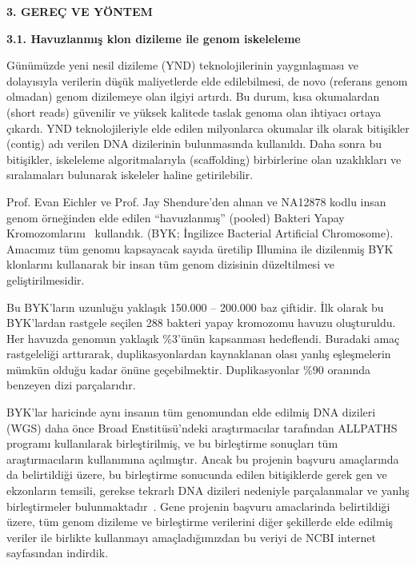 \documentclass[11pt]{article}
\begin{document}
\clearpage


\begin{center}
{\bf \Large 3. GEREÇ VE YÖNTEM} 
\end{center}
\noindent

{\bf \large 3.1. Havuzlanmış klon dizileme ile genom iskeleleme}


Günümüzde yeni nesil dizileme (YND) teknolojilerinin yaygınlaşması ve dolayısıyla verilerin düşük maliyetlerde elde edilebilmesi, de novo (referans genom olmadan) 
genom dizilemeye olan ilgiyi artırdı.
Bu durum, kısa okumalardan (short reads) güvenilir ve yüksek kalitede taslak genoma olan ihtiyacı ortaya çıkardı. YND teknolojileriyle elde edilen milyonlarca okumalar ilk olarak bitişikler (contig) adı verilen DNA dizilerinin bulunmasında kullanıldı. Daha sonra bu bitişikler, iskeleleme algoritmalarıyla (scaffolding) birbirlerine olan uzaklıkları ve sıralamaları bulunarak iskeleler haline getirilebilir.

Prof. Evan Eichler ve Prof. Jay Shendure'den alınan ve NA12878 kodlu insan genom örneğinden elde edilen ``havuzlanmış'' (pooled) Bakteri Yapay Kromozomlarını~\cite{Kitzman2011} kullandık. 
(BYK; İngilizce Bacterial Artificial Chromosome). 
Amacımız tüm genomu kapsayacak sayıda üretilip Illumina ile dizilenmiş BYK klonlarını kullanarak bir insan tüm genom dizisinin düzeltilmesi ve geliştirilmesidir.
	
Bu BYK’ların uzunluğu yaklaşık 150.000 – 200.000 baz çiftidir. İlk olarak bu BYK'lardan rastgele seçilen 288 bakteri yapay kromozomu havuzu oluşturuldu. Her havuzda genomun yaklaşık \%3'ünün 
kapsanması hedeflendi. Buradaki amaç rastgeleliği arttırarak, duplikasyonlardan kaynaklanan olası yanlış eşleşmelerin mümkün olduğu kadar önüne geçebilmektir. 
Duplikasyonlar \%90 oranında benzeyen dizi parçalarıdır. 

BYK’lar haricinde aynı insanın tüm genomundan elde edilmiş DNA dizileri (WGS) daha önce Broad Enstitüsü’ndeki araştırmacılar tarafından ALLPATHS~\cite{Gnerre2011} programı kullanılarak birleştirilmiş, ve bu birleştirme sonuçları tüm araştırmacıların kullanımına açılmıştır. Ancak bu projenin başvuru amaçlarında da belirtildiği üzere, bu birleştirme sonucunda edilen bitişiklerde gerek gen ve ekzonların temsili, gerekse tekrarlı DNA dizileri nedeniyle parçalanmalar ve yanlış birleştirmeler bulunmaktadır~\cite{Alkan2011c}. Gene projenin başvuru amaclarinda belirtildiği üzere, tüm genom dizileme ve birleştirme verilerini diğer şekillerde elde edilmiş veriler ile birlikte kullanmayı amaçladığımızdan bu veriyi de NCBI internet sayfasından indirdik.
\end{document}
